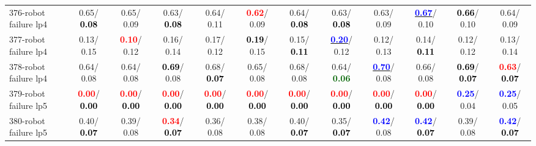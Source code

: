 \begin{table}[h]
\begin{center}
{\begin{tabular}{lc|c|c|c|c|c|c|c|c|c|c}
376-robot failure lp4 &   0.65/\textcolor{black}{\textbf{  0.08}} &   0.65/  0.09 &   0.63/\textcolor{black}{\textbf{  0.08}} &   0.64/  0.11 & \textcolor{red}{\textbf{  0.62}}/  0.09 &   0.64/\textcolor{black}{\textbf{  0.08}} &   0.63/\textcolor{black}{\textbf{  0.08}} &   0.63/  0.09 & \underline{\textcolor{blue}{\textbf{  0.67}}}/  0.10 & \textcolor{black}{\textbf{  0.66}}/  0.10 &   0.64/  0.09 \\
377-robot failure lp4 &   0.13/  0.15 & \textcolor{red}{\textbf{  0.10}}/  0.12 &   0.16/  0.14 &   0.17/  0.12 & \textcolor{black}{\textbf{  0.19}}/  0.15 &   0.15/\textcolor{black}{\textbf{  0.11}} & \underline{\textcolor{blue}{\textbf{  0.20}}}/  0.12 &   0.12/  0.13 &   0.14/\textcolor{black}{\textbf{  0.11}} &   0.12/  0.12 &   0.13/  0.14 \\
378-robot failure lp4 &   0.64/  0.08 &   0.64/  0.08 & \textcolor{black}{\textbf{  0.69}}/  0.08 &   0.68/\textcolor{black}{\textbf{  0.07}} &   0.65/  0.08 &   0.68/  0.08 &   0.64/\textcolor{darkgreen}{\textbf{  0.06}} & \underline{\textcolor{blue}{\textbf{  0.70}}}/  0.08 &   0.66/  0.08 & \textcolor{black}{\textbf{  0.69}}/\textcolor{black}{\textbf{  0.07}} & \textcolor{red}{\textbf{  0.63}}/\textcolor{black}{\textbf{  0.07}} \\
379-robot failure lp5 & \textcolor{red}{\textbf{  0.00}}/\textcolor{black}{\textbf{  0.00}} & \textcolor{red}{\textbf{  0.00}}/\textcolor{black}{\textbf{  0.00}} & \textcolor{red}{\textbf{  0.00}}/\textcolor{black}{\textbf{  0.00}} & \textcolor{red}{\textbf{  0.00}}/\textcolor{black}{\textbf{  0.00}} & \textcolor{red}{\textbf{  0.00}}/\textcolor{black}{\textbf{  0.00}} & \textcolor{red}{\textbf{  0.00}}/\textcolor{black}{\textbf{  0.00}} & \textcolor{red}{\textbf{  0.00}}/\textcolor{black}{\textbf{  0.00}} & \textcolor{red}{\textbf{  0.00}}/\textcolor{black}{\textbf{  0.00}} & \textcolor{red}{\textbf{  0.00}}/\textcolor{black}{\textbf{  0.00}} & \textcolor{blue}{\textbf{  0.25}}/  0.04 & \textcolor{blue}{\textbf{  0.25}}/  0.05 \\
380-robot failure lp5 &   0.40/\textcolor{black}{\textbf{  0.07}} &   0.39/  0.08 & \textcolor{red}{\textbf{  0.34}}/\textcolor{black}{\textbf{  0.07}} &   0.36/  0.08 &   0.38/  0.08 &   0.40/\textcolor{black}{\textbf{  0.07}} &   0.35/\textcolor{black}{\textbf{  0.07}} & \textcolor{blue}{\textbf{  0.42}}/  0.08 & \textcolor{blue}{\textbf{  0.42}}/\textcolor{black}{\textbf{  0.07}} &   0.39/  0.08 & \textcolor{blue}{\textbf{  0.42}}/\textcolor{black}{\textbf{  0.07}} \\ \hline

\end{tabular}}
\end{center}
\end{table}
